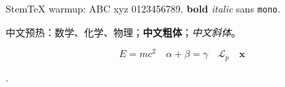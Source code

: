 


\begin{preview}

StemTeX warmup: ABC xyz 0123456789.
\textbf{bold} \textit{italic} \textsf{sans} \texttt{mono}.

中文预热：数学、化学、物理；\textbf{中文粗体}；\textit{中文斜体}。

\[
  E=mc^2 \quad \alpha+\beta=\gamma \quad \mathcal{L}_{p} \quad \mathbf{x}
\]

 .

\end{preview}

